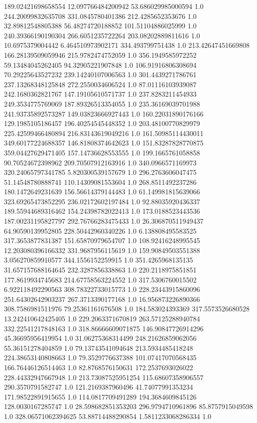 189.02421698658554	12.097766484200942	53.686029985000594	1.0
244.20099832635708	331.0845780401386	212.4285652353676	1.0
32.89812548805388	56.48274720188852	101.51104886025999	1.0
240.39366190190304	266.6051235722264	203.08202889811616	1.0
10.6975379004442	6.464510973902171	334.493799751438	1.0
213.42647451669808	166.28139509059946	215.9782474752059	1.0
356.1949585972252	59.13484045262405	94.32905221907848	1.0
106.91916806308694	70.29225643527232	239.14240107006563	1.0
301.4439271786761	237.13268348125848	272.2550034606524	1.0
87.01116103939087	242.1680362821767	147.19105610571737	1.0
237.8283211454933	249.3534775769069	187.89326513354055	1.0
235.36169039701988	241.93735892573287	149.03823666927443	1.0
160.22031890176166	129.1985105186457	196.40254545448352	1.0
203.48100770829979	225.42599466480894	216.83143619049216	1.0
161.50985114430011	349.60177224688357	146.81808374642623	1.0
151.83287828770875	359.04427629471405	157.14736628553555	1.0
199.1665761058858	90.70524672398962	209.70507912163916	1.0
340.0966571169973	320.24065797341785	5.820300539157679	1.0
296.2763606047475	51.14548780888741	110.14309081553604	1.0
268.8511492237286	180.1472649231639	156.56614379144483	1.0
61.149981815639066	323.69265473852295	236.02172602197484	1.0
92.88035920436337	189.55944689316462	154.24398782022413	1.0
173.0188523443536	187.00231195827797	292.76766283475433	1.0
26.306870511949437	64.90590139952805	228.50442960340226	1.0
6.138808495583525	317.3653877831387	151.65870979654707	1.0
108.92416248995545	12.203080396166332	331.9687956115619	1.0
159.90849503551388	3.056270859910577	344.1556152259915	1.0
351.4265968135135	31.657157688164645	232.3287856338863	1.0
220.2118975851851	177.8619934745683	214.67758563224552	1.0
317.5306760015502	6.922118492290563	308.78322733015773	1.0
228.23443915860096	251.64302642903237	267.3713390177168	1.0
16.956873226890366	308.7586981511976	79.25361161676508	1.0
184.583024393369	317.5573526680528	13.242410642425405	1.0
229.2063371670819	263.57125288940784	332.22541217848163	1.0
318.86666609071875	146.90847726914296	45.36695956419954	1.0
31.06275368314499	248.21626859062056	55.36151278404859	1.0
79.13743541094648	213.5934485418248	224.38653140808663	1.0
79.3529776637388	101.07417070568435	166.76446126514463	1.0
82.8768576150631	172.2537693026022	228.44332947667948	1.0
213.73087525951254	115.68607358906557	290.3570791582747	1.0
121.2169387960496	41.74077991353234	171.98522891915655	1.0
114.0817709491289	194.3684609845126	128.0030167285747	1.0
28.598682851353203	296.9794710961896	85.8757915049598	1.0
328.06571062394625	53.88714488290854	1.5811233068286334	1.0
